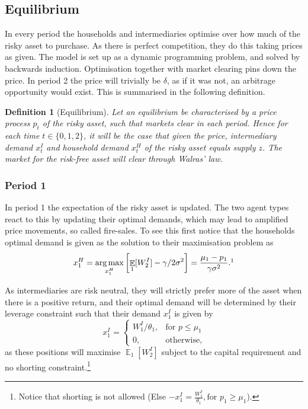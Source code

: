 \documentclass[11pt]{article}
\DeclareMathOperator{\E}{\mathbb{E}} %
\newtheorem{definition}{Definition}%
\DeclareMathOperator*{\argmax}{arg\,max} %
\begin{document}
\subsection*{Equilibrium}
In every period the households and intermediaries optimise over how much of the risky asset to purchase. As there is perfect competition, they do this taking prices as given. The model is set up as a dynamic programming problem, and solved by backwards induction. 
Optimisation together with market clearing pins down the price.
In period 2 the price will trivially be $\delta$, as if it was not, an arbitrage opportunity would exist. This is summarised in the following definition.


\begin{definition}[Equilibrium] \label{d_eqm}
Let an equilibrium be characterised by a price process $p_t$ of the risky asset, such that markets clear in each period. Hence for each time $t\in\{0,1,2\}$, it will be the case that given the price, intermediary demand $x^I_t$ and household demand $x^H_t$ of the risky asset equals supply $z$. The market for the risk-free asset will clear through Walras' law.
\end{definition}

\subsubsection*{Period 1}
In period 1 the expectation of the risky asset is updated. The two agent types react to this by updating their optimal demands, which may lead to amplified price movements, so called fire-sales. To see this first notice that the households optimal demand is given as the solution to their maximisation problem as
\begin{equation} \label{e_xH}
x^{H}_1 = \argmax_{x^H_1}\left[\E_1[W^I_2] - \gamma/2\sigma^2\right]
= \frac{\mu_1 - p_1}{\gamma\sigma^2}.\footnotemark
\end{equation}

As intermediaries are risk neutral, they will strictly prefer more of the asset when there is a positive return, and their optimal demand will be determined by their leverage constraint such that their demand $x^I_1$ is given by
\begin{equation}  \label{e_xI}
x^I_1 = \begin{cases}
 W^I_1/\theta_1, &\text{for $p \leq \mu_1$}\\
 0, &\text{otherwise,}
\end{cases}
\end{equation}
\noindent as these positions will maximise $\E_1[W^I_2]$ subject to the capital requirement and no shorting constraint.\footnote{Notice that shorting is not allowed (Else $-x^I_1 = \frac{W^I_1}{\theta_1}, \text{for } p_1 \geq \mu_1$).}
\end{document}

